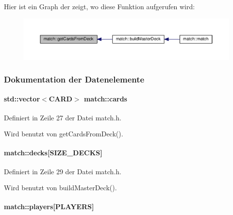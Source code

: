 Hier ist ein Graph der zeigt, wo diese Funktion aufgerufen wird\-:\nopagebreak
\begin{figure}[H]
\begin{center}
\leavevmode
\includegraphics[width=350pt]{db/d43/classmatch_a690fc86b621fdd5367a35376fc85130a_icgraph}
\end{center}
\end{figure}




\subsubsection{Dokumentation der Datenelemente}
\hypertarget{classmatch_afe9f4e5f94c2c9873db6640281e12dcf}{
\paragraph[{cards}]{\setlength{\rightskip}{0pt plus 5cm}std\-::vector$<${\bf C\-A\-R\-D}$>$ match\-::cards\hspace{0.3cm}{\ttfamily [private]}}}\label{classmatch_afe9f4e5f94c2c9873db6640281e12dcf}


Definiert in Zeile 27 der Datei match.\-h.



Wird benutzt von get\-Cards\-From\-Deck().

\hypertarget{classmatch_a98a4bea4adf4d10ede8436486cc38418}{
\paragraph[{decks}]{ match\-::decks\mbox{[}{\bf S\-I\-Z\-E\-\_\-\-D\-E\-C\-K\-S}\mbox{]}\hspace{0.3cm}{\ttfamily [private]}}}\label{classmatch_a98a4bea4adf4d10ede8436486cc38418}


Definiert in Zeile 29 der Datei match.\-h.



Wird benutzt von build\-Master\-Deck().

\hypertarget{classmatch_a07c8604710b0af37d2e1c3f84e5fca6a}{
\paragraph[{players}]{ match\-::players\mbox{[}{\bf P\-L\-A\-Y\-E\-R\-S}\mbox{]}\hspace{0.3cm}{\ttfamily [private]}}}\label{classmatch_a07c8604710b0af37d2e1c3f84e5fca6a}


